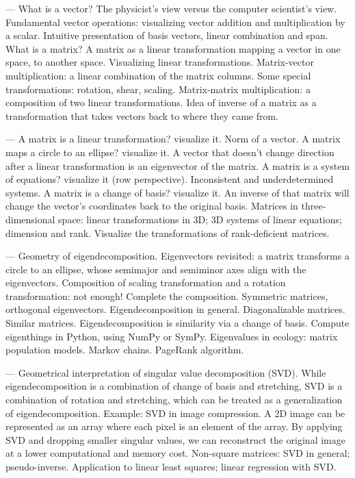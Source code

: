 \documentclass[10pt,journal,compsoc]{IEEEtran}
\begin{document}
\begin{description}[style=unboxed]
\item[Lesson 1: Transform all the vectors]---
What is a vector? The physicist's view versus the computer scientist's view. Fundamental vector operations: visualizing vector addition and multiplication by a scalar. Intuitive presentation of basis vectors, linear combination and span. What is a matrix? A matrix as a linear transformation mapping a vector in one space, to another space. Visualizing linear transformations. Matrix-vector multiplication: a linear combination of the matrix columns. Some special transformations: rotation, shear, scaling. Matrix-matrix multiplication: a composition of two linear transformations. Idea of inverse of a matrix as a transformation that takes vectors back to where they came from.

\item[Lesson 2: The matrix is everywhere]---
A matrix is a linear transformation? visualize it. Norm of a vector. A matrix maps a circle to an ellipse? visualize it. A vector that doesn't change direction after a linear transformation is an eigenvector of the matrix. A matrix is a system of equations? visualize it (row perspective). Inconsistent and underdetermined systems. A matrix is a change of basis? visualize it. An inverse of that matrix will change the vector's coordinates back to the original basis. Matrices in three-dimensional space: linear transformations in 3D; 3D systems of linear equations; dimension and rank. Visualize the transformations of rank-deficient matrices.

\item[Lesson 3: Eigenvectors for the win]---
Geometry of eigendecomposition. Eigenvectors revisited: a matrix transforms a circle to an ellipse, whose semimajor and semiminor axes align with the eigenvectors. Composition of scaling transformation and a rotation transformation: not enough! Complete the composition. Symmetric matrices, orthogonal eigenvectors. Eigendecomposition in general. Diagonalizable matrices. Similar matrices. Eigendecomposition is similarity via a change of basis. Compute eigenthings in Python, using NumPy or SymPy. Eigenvalues in ecology: matrix population models. Markov chains. PageRank algorithm.

\item[Lesson 4: Stick to the essentials: SVD]---
Geometrical interpretation of singular value decomposition (SVD). While eigendecomposition is a combination of change of basis and stretching, SVD is a combination of rotation and stretching, which can be treated as a generalization of eigendecomposition. Example: SVD in image compression. A 2D image can be represented as an array where each pixel is an element of the array. By applying SVD and dropping smaller singular values, we can reconstruct the original image at a lower computational and memory cost. Non-square matrices: SVD in general; pseudo-inverse. Application to linear least squares; linear regression with SVD.

\end{description}
\end{document}
